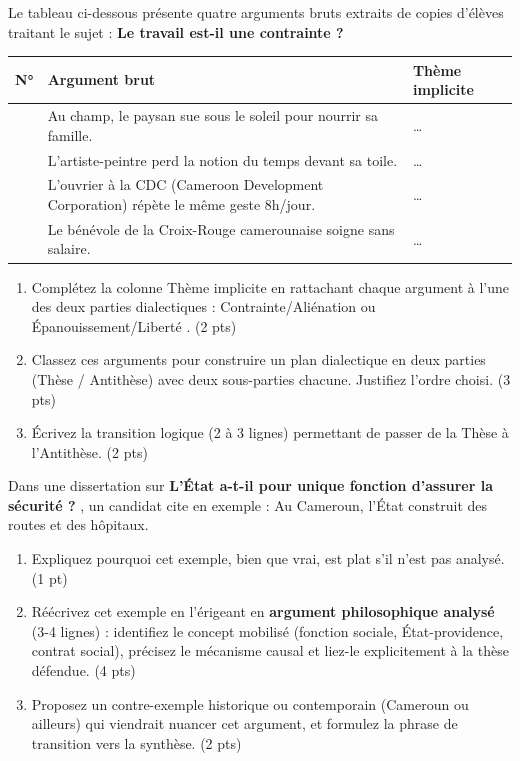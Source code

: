 \documentclass[11pt]{article}
\begin{document}
\begin{exercice}
Le tableau ci-dessous présente quatre arguments bruts extraits de copies d'élèves traitant le sujet : \og \textbf{Le travail est-il une contrainte ?} \fg{}

\begin{tabularx}{\linewidth}{>{\hsize=0.5\hsize}X >{\hsize=1.5\hsize}X >{\hsize=2\hsize}X}
\textbf{N°} & \textbf{Argument brut} & \textbf{Thème implicite} \\
\hline
1 & Au champ, le paysan sue sous le soleil pour nourrir sa famille. & \dots \\
2 & L'artiste-peintre perd la notion du temps devant sa toile. & \dots \\
3 & L'ouvrier à la CDC (Cameroon Development Corporation) répète le même geste 8h/jour. & \dots \\
4 & Le bénévole de la Croix-Rouge camerounaise soigne sans salaire. & \dots \\
\end{tabularx}

\begin{enumerate}
    \item Complétez la colonne \og Thème implicite \fg{} en rattachant chaque argument à l'une des deux parties dialectiques : \og Contrainte/Aliénation \fg{} ou \og Épanouissement/Liberté \fg{}. (2 pts)
    \item Classez ces arguments pour construire un plan dialectique en deux parties (Thèse / Antithèse) avec deux sous-parties chacune. Justifiez l'ordre choisi. (3 pts)
    \item Écrivez la transition logique (2 à 3 lignes) permettant de passer de la Thèse à l'Antithèse. (2 pts)
\end{enumerate}
\end{exercice}

\begin{exercice}
Dans une dissertation sur \og \textbf{L'État a-t-il pour unique fonction d'assurer la sécurité ?} \fg{}, un candidat cite en exemple : \og Au Cameroun, l'État construit des routes et des hôpitaux. \fg{}
\begin{enumerate}
    \item Expliquez pourquoi cet exemple, bien que vrai, est \og plat \fg{} s'il n'est pas analysé. (1 pt)
    \item Réécrivez cet exemple en l'érigeant en \textbf{argument philosophique analysé} (3-4 lignes) : identifiez le concept mobilisé (fonction sociale, État-providence, contrat social), précisez le mécanisme causal et liez-le explicitement à la thèse défendue. (4 pts)
    \item Proposez un contre-exemple historique ou contemporain (Cameroun ou ailleurs) qui viendrait nuancer cet argument, et formulez la phrase de transition vers la synthèse. (2 pts)
\end{enumerate}
\end{exercice}
\end{document}
